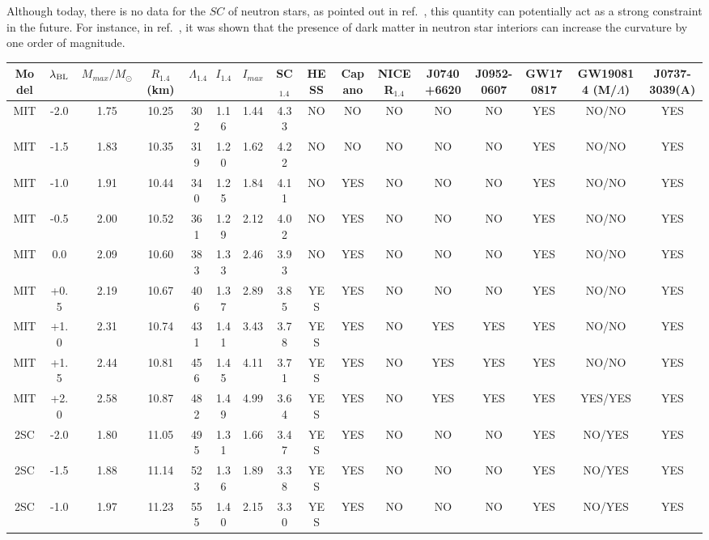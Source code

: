 \documentclass[%
reprint,
superscriptaddress,
nofootinbib,
amsmath,
amssymb,
aps,
floatfix,
showkeys,
]{revtex4-2}
\begin{document}
Although today, there is no data for the $SC$ of neutron stars, as pointed out in ref.~\cite{Kazim_2014}, this quantity can potentially act as a strong constraint in the future. For instance, in ref.~\cite{Das_2021}, it was shown that the presence of dark matter in neutron star interiors can increase the curvature by one order of magnitude.
\begin{sidewaystable*}
\begin{center}
\centering
\begin{tabular}{|cc|cccccc|cccccccc|}
\hline
Model  & $\lambda_{\rm BL}$ & $M_{max}/M_\odot$   & $R_{1.4}$ (km) &$\Lambda_{1.4}$ & $I_{1.4}$  & $I_{max}$ & SC$_{1.4}$ & HESS & Capano & NICER$_{1.4}$ & J0740+6620 & J0952-0607 & GW170817 & GW190814 (M/$\Lambda$) & J0737-3039(A)\\
\hline
MIT &  -2.0 & 1.75 & 10.25 & 302 & 1.16 & 1.44 & 4.33 & NO & NO & NO & NO & NO & YES & NO/NO & YES   \\
MIT &  -1.5 & 1.83 & 10.35 & 319 & 1.20 & 1.62 & 4.22 & NO & NO & NO & NO & NO &  YES & NO/NO & YES  \\
MIT &  -1.0 & 1.91 & 10.44 & 340 & 1.25 &  1.84 & 4.11 & NO & YES & NO & NO & NO & YES &NO/NO & YES  \\
MIT &  -0.5 & 2.00 & 10.52 & 361 & 1.29 & 2.12 & 4.02 & NO & YES & NO & NO & NO & YES & NO/NO & YES \\
MIT &  0.0 & 2.09 & 10.60 & 383 & 1.33 & 2.46 & 3.93 & NO & YES &  NO & NO & NO & YES & NO/NO & YES \\
MIT &  +0.5 & 2.19 & 10.67 & 406 & 1.37 & 2.89 & 3.85 & YES & YES & NO & NO & NO & YES & NO/NO & YES \\
MIT &  +1.0 & 2.31 & 10.74 & 431 & 1.41 & 3.43 & 3.78 & YES & YES & NO & YES & YES & YES  & NO/NO & YES   \\
MIT &  +1.5 & 2.44 & 10.81 & 456 & 1.45 & 4.11 & 3.71 & YES & YES & NO & YES & YES & YES & NO/NO  & YES  \\
MIT &  +2.0 & 2.58 & 10.87 & 482 & 1.49 & 4.99 & 3.64 & YES & YES & NO & YES & YES & YES & YES/YES & YES    \\
\hline
2SC &  -2.0 & 1.80 & 11.05 & 495 & 1.31 & 1.66 & 3.47 & YES  & YES  & NO & NO  & NO & YES & NO/YES & YES \\
2SC &  -1.5 & 1.88 & 11.14 & 523 & 1.36 & 1.89 & 3.38  & YES & YES & NO & NO & NO & YES & NO/YES & YES  \\
2SC &  -1.0 & 1.97 & 11.23 & 555 &  1.40 & 2.15 & 3.30 & YES & YES & NO & NO & NO & YES & NO/YES & YES\\

\end{tabular}
\end{center}
\end{sidewaystable*}
\end{document}
